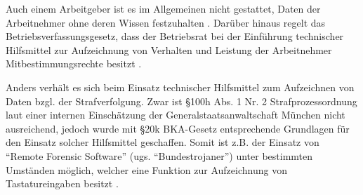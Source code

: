 Auch einem Arbeitgeber ist es im Allgemeinen nicht gestattet, Daten der Arbeitnehmer ohne deren Wissen festzuhalten \cite{bildscharbv}. Darüber hinaus regelt das Betriebsverfassungsgesetz, dass der Betriebsrat bei der Einführung technischer Hilfsmittel zur Aufzeichnung von Verhalten und Leistung der Arbeitnehmer Mitbestimmungsrechte besitzt \cite{betrvg}.

Anders verhält es sich beim Einsatz technischer Hilfsmittel zum Aufzeichnen von Daten bzgl. der Strafverfolgung. Zwar ist \S 100h Abs. 1 Nr. 2 Strafprozessordnung \cite{stpo} laut einer internen Einschätzung der Generalstaatsanwaltschaft München \cite{munich} nicht ausreichend, jedoch wurde mit \S 20k BKA-Gesetz \cite{bkag} entsprechende Grundlagen für den Einsatz solcher Hilfsmittel geschaffen. Somit ist z.B. der Einsatz von ``Remote Forensic Software'' (ugs. ``Bundestrojaner'') unter bestimmten Umständen möglich, welcher eine Funktion zur Aufzeichnung von Tastatureingaben besitzt \cite{spd}.